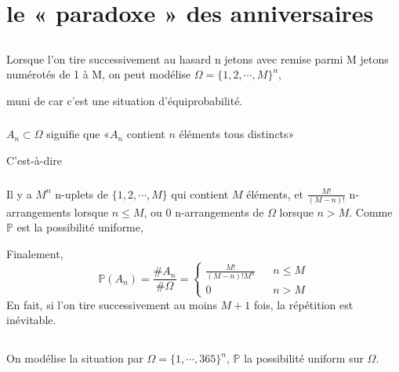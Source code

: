 \documentclass[a4paper,12pt]{book}
\begin{document}
\renewcommand{\labelitemi}{$\blacktriangleright$}
\renewcommand{\labelitemii}{$\bullet$}


\section{le « paradoxe » des anniversaires}
\subsection{}
\subsubsection{}
Lorsque l'on tire successivement au hasard n jetons avec remise
parmi M jetons numérotés de 1 à M, on peut modélise $\boxed{\Omega=\{1,2,\cdots,M\}^n}$, 

muni de  car c'est une situation d’équiprobabilité.
\subsubsection{}
$A_n \subset \Omega$ signifie que «$A_n$ contient $n$ éléments tous distincts»

C'est-à-dire 
\subsubsection{}
Il y a $M^n$ n-uplets de $\{1,2,\cdots,M\}$ qui contient $M$ éléments, 
et $\frac{M!}{(M-n)!}$ n-arrangements lorsque $n \leq M$, 
ou $0$ n-arrangements de $\Omega$ lorsque $n > M$. Comme $\mathbb{P}$ est la possibilité uniforme, 

Finalement, 
\begin{equation}  \nonumber
    \mathbb{P}(A_n)=\frac{\#A_n}{\#\Omega}=\left\{  
                 \begin{array}{ccc}  
                 \frac{M!}{(M-n)!M^n} & & n \leq M\\  
                 0 & & n > M   
                 \end{array}  
    \right.  
\end{equation}
En fait, si l'on tire successivement au moins $M+1$ fois, la répétition est inévitable.

\subsection{}
\subsubsection{}
On modélise la situation par $\Omega=\{1,\cdots,365\}^n$, $\mathbb{P}$ la possibilité uniform sur $\Omega$.
\end{document}
